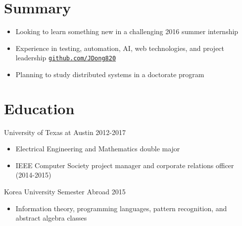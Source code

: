 \documentclass[line,margin]{res}
\begin{document}
\thispagestyle{empty} %

    \address{10336 Kilmarnock Drive, Austin, TX 78726}
    \address{(512) 917-8236 |
    \href{mailto:jdong42@gmail.com}{jdong42@gmail.com}}

\begin{resume}

\vspace{-8pt}
\section{Summary}
\vspace{22pt}
    \begin{itemize} \itemsep -2pt %
    \item Looking to learn something new in a challenging 2016 summer internship
    \item Experience in testing, automation, AI, web technologies, and project leadership \href{https://www.github.com/JDong820}{\texttt{github.com/JDong820}}
    \item Planning to study distributed systems in a doctorate program
    \end{itemize}

   
\vspace{-8pt}
\section{Education} 
\vspace{12pt}
University of Texas at Austin \hfill 2012-2017 \\
\vspace{-12pt}
    \begin{itemize} \itemsep -2pt %
    \item Electrical Engineering and Mathematics double major
    \item IEEE Computer Society project manager and corporate relations officer (2014-2015)
    \end{itemize}
 
\vspace{-6pt}
Korea University Semester Abroad \hfill 2015 \\
\vspace{-12pt}
    \begin{itemize} \itemsep -2pt %
    \item Information theory, programming languages, pattern recognition, and abstract algebra classes
    \end{itemize}
  


\end{resume}
\end{document}
